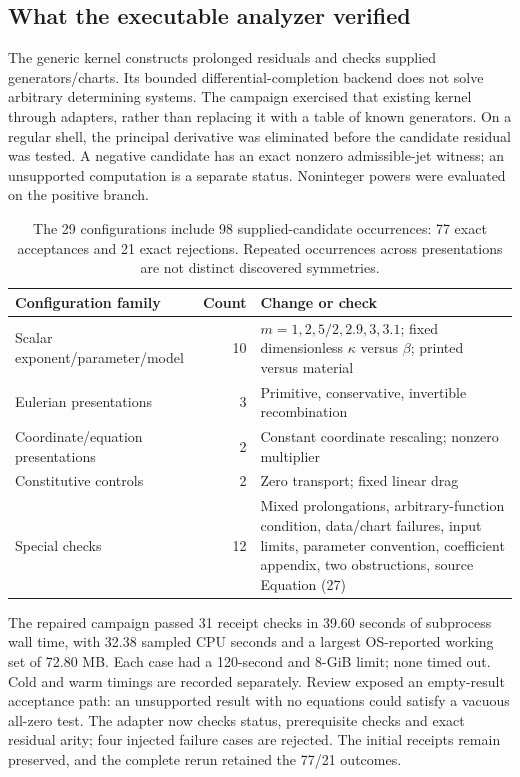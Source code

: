 \subsection{What the executable analyzer verified}
\label{sec:autonomous-analyzer}
The generic kernel constructs prolonged residuals and checks supplied
generators/charts. Its bounded differential-completion backend does not
solve arbitrary determining systems. The campaign exercised that existing
kernel through adapters, rather than replacing it with a table of known
generators. On a regular shell, the principal derivative was eliminated
before the candidate residual was tested. A negative candidate has an exact
nonzero admissible-jet witness; an unsupported computation is a separate
status. Noninteger powers were evaluated on the positive branch.

\begin{table}[htbp]\centering\small
\begin{tabularx}{\linewidth}{@{}l r X@{}}\toprule
Configuration family & Count & Change or check \\\midrule
Scalar exponent/parameter/model & 10 & $m=1,2,5/2,2.9,3,3.1$;
fixed dimensionless $\kappa$ versus $\beta$; printed versus material \\
Eulerian presentations & 3 & Primitive, conservative, invertible recombination \\
Coordinate/equation presentations & 2 & Constant coordinate rescaling; nonzero multiplier \\
Constitutive controls & 2 & Zero transport; fixed linear drag \\
Special checks & 12 & Mixed prolongations, arbitrary-function condition,
data/chart failures, input limits, parameter convention, coefficient
appendix, two obstructions, source Equation (27) \\\bottomrule
\end{tabularx}
\caption{The 29 configurations include 98 supplied-candidate occurrences:
77 exact acceptances and 21 exact rejections. Repeated occurrences across
presentations are not distinct discovered symmetries.}
\label{tab:autonomous-symbolic}
\end{table}

The repaired campaign passed 31 receipt checks in 39.60 seconds of
subprocess wall time, with 32.38 sampled CPU seconds and a largest
OS-reported working set of 72.80 MB. Each case had a 120-second and 8-GiB
limit; none timed out. Cold and warm timings are recorded separately.
Review exposed an empty-result acceptance path: an unsupported result with
no equations could satisfy a vacuous all-zero test. The adapter now checks
status, prerequisite checks and exact residual arity; four injected failure
cases are rejected. The initial receipts remain preserved, and the complete
rerun retained the 77/21 outcomes.

